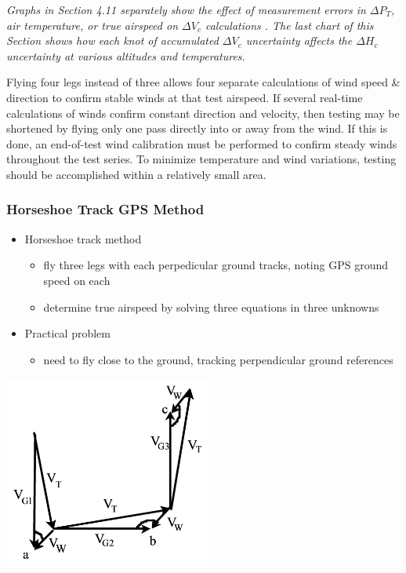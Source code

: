 \documentclass[
]{book}
\providecommand{\tightlist}{%
  \setlength{\itemsep}{0pt}\setlength{\parskip}{0pt}}
\begin{document}
\emph{Graphs in Section 4.11 separately show the effect of measurement errors in \(\Delta P_T\), air temperature, or true airspeed on \(\Delta V_c\) calculations . The last chart of this Section shows how each knot of accumulated \(\Delta V_c\) uncertainty affects the \(\Delta H_c\) uncertainty at various altitudes and temperatures.}

Flying four legs instead of three allows four separate calculations of wind speed \& direction to confirm stable winds at that test airspeed. If several real-time calculations of winds confirm constant direction and velocity, then testing may be shortened by flying only one pass directly into or away from the wind. If this is done, an end-of-test wind calibration must be performed to confirm steady winds throughout the test series. To minimize temperature and wind variations, testing should be accomplished within a relatively small area.

\hypertarget{horseshoe-track-gps-method}{%
\subsubsection*{Horseshoe Track GPS Method}\label{horseshoe-track-gps-method}}

\begin{itemize}
\tightlist
\item
  Horseshoe track method

  \begin{itemize}
  \tightlist
  \item
    fly three legs with each perpedicular ground tracks, noting GPS ground speed on each
  \item
    determine true airspeed by solving three equations in three unknowns
  \end{itemize}
\item
  Practical problem

  \begin{itemize}
  \tightlist
  \item
    need to fly close to the ground, tracking perpendicular ground references
  \end{itemize}
\end{itemize}

\includegraphics[width=2.7in,height=2.49514in]{media/04/image28.svg}
\end{document}

